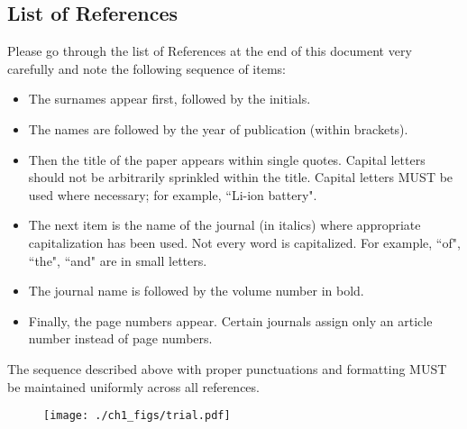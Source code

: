 \subsection{List of References}

Please go through the list of References at the end of this document very carefully and note the following sequence of items:
\begin{itemize}
\item The surnames appear first, followed by the initials. 
\item The names are followed by the year of publication (within brackets). 
\item Then the title of the paper appears within single quotes. Capital letters should not be arbitrarily sprinkled within the title. Capital letters MUST be used where necessary; for example, ``Li-ion battery". 
\item The next item is the name of the journal (in italics) where appropriate capitalization has been used. Not every word is capitalized. For example, ``of", ``the", ``and" are in small letters.  
\item The journal name is followed by the volume number in bold. 
\item Finally, the page numbers appear. Certain journals assign only an article number instead of page numbers. 
\end{itemize}

The sequence described above with proper punctuations and formatting MUST be maintained uniformly across all references.  


\begin{figure}[!htb]
\centering
\texttt{[image: ./ch1\_figs/trial.pdf]}
\end{figure}


